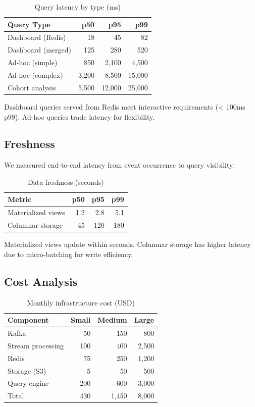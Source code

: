 \begin{table}[h]
\centering
\caption{Query latency by type (ms)}
\label{tab:query_latency}
\begin{tabular}{lrrr}
\hline
Query Type & p50 & p95 & p99 \\
\hline
Dashboard (Redis) & 18 & 45 & 82 \\
Dashboard (merged) & 125 & 280 & 520 \\
Ad-hoc (simple) & 850 & 2,100 & 4,500 \\
Ad-hoc (complex) & 3,200 & 8,500 & 15,000 \\
Cohort analysis & 5,500 & 12,000 & 25,000 \\
\hline
\end{tabular}
\end{table}

Dashboard queries served from Redis meet interactive requirements (< 100ms p99). Ad-hoc queries trade latency for flexibility.

\subsection{Freshness}

We measured end-to-end latency from event occurrence to query visibility:

\begin{table}[h]
\centering
\caption{Data freshness (seconds)}
\label{tab:freshness}
\begin{tabular}{lrrr}
\hline
Metric & p50 & p95 & p99 \\
\hline
Materialized views & 1.2 & 2.8 & 5.1 \\
Columnar storage & 45 & 120 & 180 \\
\hline
\end{tabular}
\end{table}

Materialized views update within seconds. Columnar storage has higher latency due to micro-batching for write efficiency.

\subsection{Cost Analysis}

\begin{table}[h]
\centering
\caption{Monthly infrastructure cost (USD)}
\label{tab:cost}
\begin{tabular}{lrrr}
\hline
Component & Small & Medium & Large \\
\hline
Kafka & 50 & 150 & 800 \\
Stream processing & 100 & 400 & 2,500 \\
Redis & 75 & 250 & 1,200 \\
Storage (S3) & 5 & 50 & 500 \\
Query engine & 200 & 600 & 3,000 \\
\hline
Total & 430 & 1,450 & 8,000 \\
\hline
\end{tabular}
\end{table}

